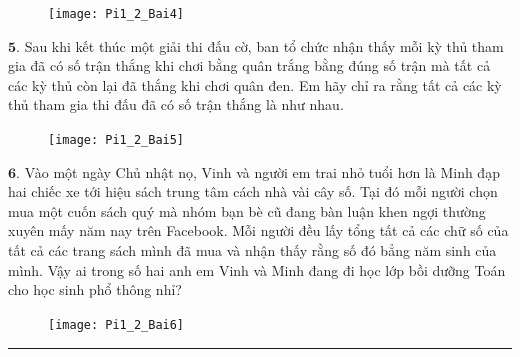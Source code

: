 \begin{multicols}{2}
	\begin{figure}[H]
		\centering
		\vspace*{-5pt}
		\captionsetup{labelformat= empty, justification=centering}
		\texttt{[image: Pi1\_2\_Bai4]}
		\vspace*{-20pt}
	\end{figure}
	$\pmb{5.}$ 	Sau khi kết thúc một giải thi đấu cờ, ban tổ chức nhận thấy mỗi kỳ thủ tham gia đã có số trận thắng khi chơi bằng quân trắng bằng đúng số trận mà tất cả các kỳ thủ còn lại đã thắng khi chơi quân đen. Em hãy chỉ ra rằng tất cả các kỳ thủ tham gia thi đấu đã có số trận thắng là như nhau.
	\begin{figure}[H]
		\centering
		\vspace*{2pt}
		\captionsetup{labelformat= empty, justification=centering}
		\texttt{[image: Pi1\_2\_Bai5]}
		\vspace*{-10pt}
	\end{figure}
	$\pmb{6.}$ Vào một ngày Chủ nhật nọ, Vinh và người em trai nhỏ tuổi hơn là Minh  đạp hai chiếc xe tới hiệu sách trung tâm cách nhà vài cây số. Tại đó mỗi người chọn mua một cuốn sách quý mà nhóm bạn bè cũ đang bàn luận khen ngợi thường xuyên mấy năm nay trên Facebook. Mỗi người đều lấy tổng tất cả các chữ số của tất cả các trang sách mình đã mua và nhận thấy rằng số đó bẳng năm sinh của mình. Vậy ai  trong số hai anh em Vinh và Minh  đang đi học lớp  bồi dưỡng Toán cho học sinh phổ thông nhỉ?
	\begin{figure}[H]
		\centering
		\vspace*{-10pt}
		\captionsetup{labelformat= empty, justification=centering}
		\texttt{[image: Pi1\_2\_Bai6]}
		\vspace*{-15pt}
	\end{figure}
\end{multicols}
\vspace*{-15pt}
{\color{toancuabi}\rule{1\linewidth}{0.1pt}}
\begingroup
